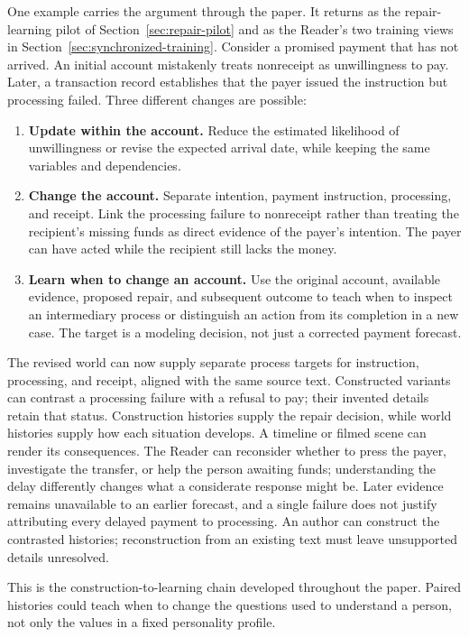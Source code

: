 \documentclass[10pt]{article}
\begin{document}
One example carries the argument through the paper. It returns as the
repair-learning pilot of Section~\ref{sec:repair-pilot} and as the Reader's two
training views in Section~\ref{sec:synchronized-training}. Consider a promised payment that has
not arrived. An initial account
mistakenly treats nonreceipt as unwillingness to pay. Later, a transaction
record establishes that the payer issued the instruction but processing failed.
Three different changes are possible:
\begin{enumerate}[nosep]
  \item \textbf{Update within the account.} Reduce the estimated likelihood of
    unwillingness or revise the expected arrival date, while keeping the same
    variables and dependencies.
  \item \textbf{Change the account.} Separate intention, payment instruction,
    processing, and receipt. Link the processing failure to nonreceipt rather
    than treating the recipient's missing funds as direct evidence of the
    payer's intention. The payer can have acted while the recipient still lacks
    the money.
  \item \textbf{Learn when to change an account.} Use the original account,
    available evidence, proposed repair, and subsequent outcome to teach when
    to inspect an intermediary process or distinguish an action from its
    completion in a new case. The target is a modeling decision, not just a
    corrected payment forecast.
\end{enumerate}

The revised world can now supply separate process targets for instruction,
processing, and receipt, aligned with the same source text. Constructed
variants can contrast a processing failure with a refusal to pay; their
invented details retain that status. Construction histories supply the repair
decision, while world histories supply how each situation develops. A timeline
or filmed scene can render its consequences. The Reader can reconsider whether
to press the payer, investigate the transfer, or help the person awaiting funds;
understanding the delay differently changes what a considerate response might
be. Later evidence remains unavailable to an earlier forecast, and a single
failure does not justify attributing every delayed payment to processing.
An author can construct the contrasted histories; reconstruction from an
existing text must leave unsupported details unresolved.

This is the construction-to-learning chain developed throughout the paper.
Paired histories could teach when to change the questions used to understand a
person, not only the values in a fixed personality profile.
\end{document}
